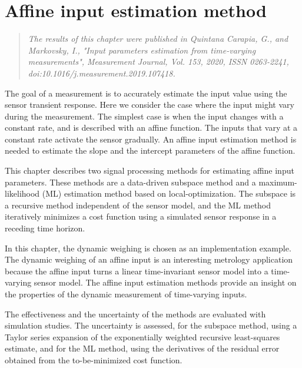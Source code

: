 

\glsresetall

\chapter{Affine input estimation method}\label{chap:AffineInput}

\begin{quote}
\emph{The results of this chapter were published in Quintana Carapia, G., and Markovsky, I.,
"Input parameters estimation from time-varying measurements", Measurement Journal, Vol. 153, 2020,
ISSN 0263-2241, doi:10.1016/j.measurement.2019.107418. \nocite{QuintanaMEAS} }\vfill{}
\end{quote}

\vfill{}


The goal of a measurement is to accurately estimate the input value using the sensor transient response.
Here we consider the case where the input might vary during the measurement.
The simplest case is when the input changes with a constant rate, and is described with an affine function.
The inputs that vary at a constant rate activate the sensor gradually. 
An affine input estimation method is needed to estimate the slope and the intercept parameters of the affine function.

This chapter describes two signal processing methods for estimating affine input parameters.
These methods are a data-driven subspace method and a maximum-likelihood (ML) estimation method based on local-optimization.
The subspace is a recursive method independent of the sensor model, and the ML method iteratively minimizes a cost function using a simulated sensor response in a receding time horizon.

In this chapter, the dynamic weighing is chosen as an implementation example.
The dynamic weighing of an affine input is an interesting metrology application because the affine input turns a linear time-invariant sensor model into a time-varying sensor model.
The affine input estimation methods provide an insight on the properties of the dynamic measurement of time-varying inputs.

The effectiveness and the uncertainty of the methods are evaluated with simulation studies.
The uncertainty is assessed, for the subspace method, using a Taylor series expansion of the exponentially weighted recursive least-squares estimate, and
for the ML method, using the derivatives of the residual error obtained from the to-be-minimized cost function.

